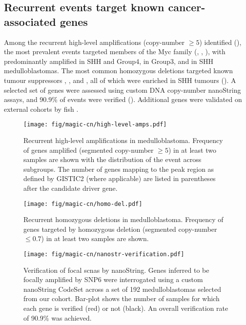\subsection{Recurrent events target known cancer-associated genes}

Among the recurrent high-level amplifications (copy-number $\geq 5$) identified (), the most prevalent events targeted members of the Myc family (, , ), with  predominantly amplified in SHH and Group4,  in Group3, and  in SHH medulloblastomas. The most common homozygous deletions targeted known tumour suppressors , , and , all of which were enriched in SHH tumours (). A selected set of genes were assessed using custom DNA copy-number nanoString assays, and 90.9\% of events were verified (). Additional genes were validated on external cohorts by \gls{fish} .

\begin{figure}[5]
	\centering
	\texttt{[image: fig/magic-cn/high-level-amps.pdf]}
	\caption[Recurrent high-level amplifications in medulloblastoma]
	{
		Recurrent high-level amplifications in medulloblastoma.
		Frequency of genes amplified (segmented copy-number $\geq 5$) in at least two samples are shown with the distribution of the event across subgroups. The number of genes mapping to the peak region as defined by GISTIC2 (where applicable) are listed in parentheses after the candidate driver gene.
	}
	\label{fig:high-level-amps}
\end{figure}

\begin{figure}[5]
	\centering
	\texttt{[image: fig/magic-cn/homo-del.pdf]}
	\caption[Recurrent homozygous deletions in medulloblastoma]
	{
		Recurrent homozygous deletions in medulloblastoma.
		Frequency of genes targeted by homozygous deletion (segmented copy-number $\leq 0.7$) in at least two samples are shown.
	}
	\label{fig:homo-del}
\end{figure}

\begin{SCfigure}[5]
	\centering
	\texttt{[image: fig/magic-cn/nanostr-verification.pdf]}
	\caption[Verification of focal \gls{scnas} by nanoString]
	{
		Verification of focal \gls{scnas} by nanoString.
		Genes inferred to be focally amplified by SNP6 were interrogated using a custom nanoString CodeSet across a set of 192 medulloblastomas selected from our cohort. Bar-plot shows the number of samples for which each gene is verified (red) or not (black). An overall verification rate of 90.9\% was achieved.
	}
	\label{fig:nanostr-verification}
\end{SCfigure}

